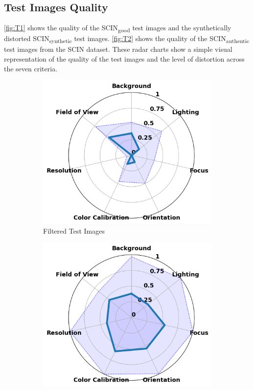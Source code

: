 \clearpage
\subsection{Test Images Quality}
\label{subsec:TestImagesQuality}
\autoref{fig:T1} shows the quality of the SCIN\textsubscript{good} test images and the synthetically distorted SCIN\textsubscript{synthetic} test images. \autoref{fig:T2} shows the quality of the SCIN\textsubscript{authentic} test images from the SCIN dataset. These radar charts show a simple visual representation of the quality of the test images and the level of distortion across the seven criteria. \par
\vspace{\baselineskip}
\begin{figure}[ht]
    \centering
    \begin{subfigure}[b]{0.45\textwidth}
        \includegraphics[width=\textwidth]{img/hept/test_70.png}
        \caption{Filtered Test Images}
        \label{fig:test_70}
    \end{subfigure}
    \hfill
    \begin{subfigure}[b]{0.45\textwidth}
        \includegraphics[width=\textwidth]{img/hept/test_70_synthetic.png}

\end{subfigure}
\end{figure}
